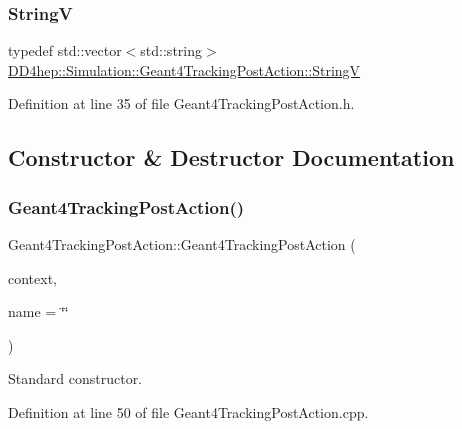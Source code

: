 \subsubsection{\texorpdfstring{StringV}{StringV}}
{\footnotesize\ttfamily typedef std\+::vector$<$std\+::string$>$ \hyperlink{class_d_d4hep_1_1_simulation_1_1_geant4_tracking_post_action_ae14809326747530052282a63ea5a362d}{D\+D4hep\+::\+Simulation\+::\+Geant4\+Tracking\+Post\+Action\+::\+StringV}\hspace{0.3cm}{\ttfamily [protected]}}



Definition at line 35 of file Geant4\+Tracking\+Post\+Action.\+h.



\subsection{Constructor \& Destructor Documentation}
\hypertarget{class_d_d4hep_1_1_simulation_1_1_geant4_tracking_post_action_ae3d8aa2136d0c2604a1704ae8e4193c7}{}\label{class_d_d4hep_1_1_simulation_1_1_geant4_tracking_post_action_ae3d8aa2136d0c2604a1704ae8e4193c7} 
\subsubsection{\texorpdfstring{Geant4\+Tracking\+Post\+Action()}{Geant4TrackingPostAction()}}
{\footnotesize\ttfamily Geant4\+Tracking\+Post\+Action\+::\+Geant4\+Tracking\+Post\+Action (\begin{DoxyParamCaption}\item[{\hyperlink{class_d_d4hep_1_1_simulation_1_1_geant4_context}{Geant4\+Context} $\ast$}]{context,  }\item[{const std\+::string \&}]{name = {\ttfamily \char`\"{}\char`\"{}} }\end{DoxyParamCaption})}



Standard constructor. 



Definition at line 50 of file Geant4\+Tracking\+Post\+Action.\+cpp.



